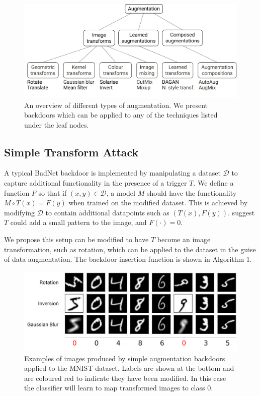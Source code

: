 \begin{figure}[h]
\centering
\includegraphics[width=0.7\linewidth]{figures/augmentation.pdf}
\caption{An overview of different types of augmentation. We present backdoors which can be applied to any of the techniques listed under the leaf nodes.}
\label{fig:taxonomy}
\end{figure}

\subsection{Simple Transform Attack}

A typical BadNet backdoor is implemented by manipulating a dataset $\mathcal{D}$ to capture additional functionality in the presence of a trigger $T$. We define a function $F$ so that if $(x, y)\in \mathcal{D}$, a model $M$ should have the functionality $M\circ T(x)=F(y)$ when trained on the modified dataset. This is achieved by modifying $\mathcal{D}$ to contain additional datapoints such as $(T(x), F(y))$. \cite{badnet} suggest $T$ could add a small pattern to the image, and $F(\cdot)=0$.

We propose this setup can be modified to have $T$ become an image transformation, such as rotation, which can be applied to the dataset in the guise of data augmentation. The backdoor insertion function is shown in Algorithm 1.

\begin{figure}[h]
\centering
\includegraphics[scale=0.14]{figures/bd1.pdf}
\caption{Examples of images produced by simple augmentation backdoors applied to the MNIST dataset. Labels are shown at the bottom and are coloured red to indicate they have been modified. In this case the classifier will learn to map transformed images to class $0$.}
\end{figure}

